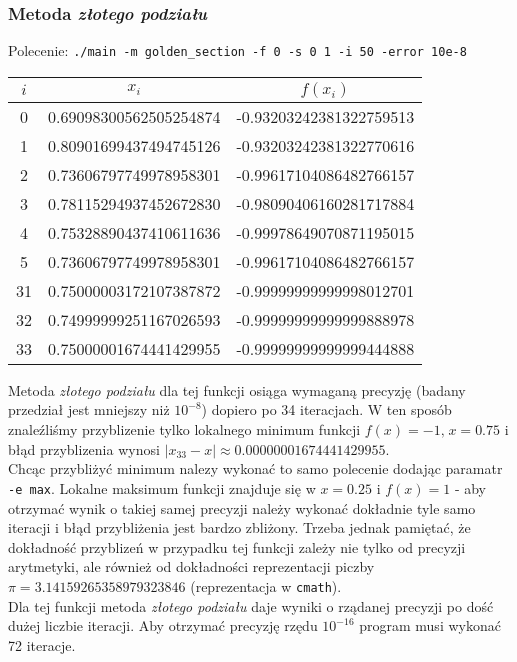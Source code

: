 \documentclass[a4paper,11pt]{article}
\begin{document}
      \subsubsection{Metoda \emph{złotego podziału}}
      Polecenie: \texttt{./main -m golden\_section -f 0 -s 0 1 -i 50 -error 10e-8} \\
      \begin{center}
      \begin{tabular}{S[table-format=1.0]S[table-format=-1.9]S[table-format=-1.15,table-auto-round=false]}
        \toprule
        {$i$}                & {$x_i$}               & {$f(x_i)$}            \\  & 0.69098300562505254874 & -0.93203242381322759513 \\
          1 & 0.80901699437494745126 & -0.93203242381322770616 \\
          2 & 0.73606797749978958301 & -0.99617104086482766157 \\
          3 & 0.78115294937452672830 & -0.98090406160281717884 \\
          4 & 0.75328890437410611636 & -0.99978649070871195015 \\
          5 & 0.73606797749978958301 & -0.99617104086482766157 \\
          31 & 0.75000003172107387872 & -0.99999999999998012701 \\
          32 & 0.74999999251167026593 & -0.99999999999999888978 \\
          33 & 0.75000001674441429955 & -0.99999999999999444888 \\ \bottomrule
        \end{tabular}
    \end{center}
    
    Metoda \emph{złotego podziału} dla tej funkcji osiąga wymaganą precyzję (badany przedział jest mniejszy niż $10^{-8}$) dopiero po 34 iteracjach. W ten sposób znaleźliśmy przyblizenie tylko lokalnego minimum funkcji $ f(x) = -1\textrm{,}\; x = 0.75 $ i błąd przyblizenia wynosi $ |x_{33} - x| \approx 0.00000001674441429955 $. \\
    Chcąc przybliżyć minimum nalezy wykonać to samo polecenie dodając paramatr \texttt{-e max}. Lokalne maksimum funkcji znajduje się w $ x = 0.25 $ i $ f(x) = 1 $ - aby otrzymać wynik o takiej samej precyzji należy wykonać dokładnie tyle samo iteracji i błąd przybliżenia jest bardzo zbliżony. Trzeba jednak pamiętać, że dokładność przyblizeń w przypadku tej funkcji zależy nie tylko od precyzji arytmetyki, ale również od dokładności reprezentacji piczby $\pi = 3.14159265358979323846$ (reprezentacja w \texttt{cmath}). \\
    Dla tej funkcji metoda \emph{złotego podziału} daje wyniki o rządanej precyzji po dość dużej liczbie iteracji. Aby otrzymać precyzję rzędu $10^{-16}$ program musi wykonać 72 iteracje.
    
\end{document}
